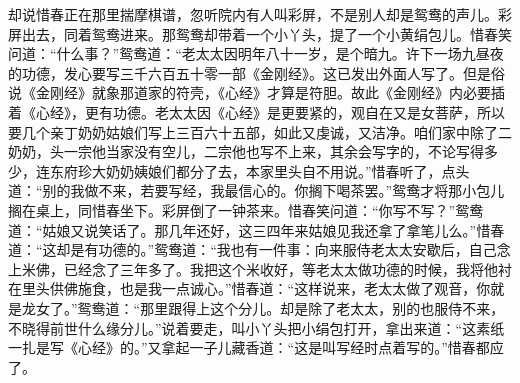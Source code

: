 


\begin{parag}
    却说惜春正在那里揣摩棋谱，忽听院内有人叫彩屏，不是别人却是鸳鸯的声儿。彩屏出去，同着鸳鸯进来。那鸳鸯却带着一个小丫头，提了一个小黄绢包儿。惜春笑问道：“什么事？”鸳鸯道：“老太太因明年八十一岁，是个暗九。许下一场九昼夜的功德，发心要写三千六百五十零一部《金刚经》。这已发出外面人写了。但是俗说《金刚经》就象那道家的符壳，《心经》才算是符胆。故此《金刚经》内必要插着《心经》，更有功德。老太太因《心经》是更要紧的，观自在又是女菩萨，所以要几个亲丁奶奶姑娘们写上三百六十五部，如此又虔诚，又洁净。咱们家中除了二奶奶，头一宗他当家没有空儿，二宗他也写不上来，其余会写字的，不论写得多少，连东府珍大奶奶姨娘们都分了去，本家里头自不用说。”惜春听了，点头道：“别的我做不来，若要写经，我最信心的。你搁下喝茶罢。”鸳鸯才将那小包儿搁在桌上，同惜春坐下。彩屏倒了一钟茶来。惜春笑问道：“你写不写？”鸳鸯道：“姑娘又说笑话了。那几年还好，这三四年来姑娘见我还拿了拿笔儿么。”惜春道：“这却是有功德的。”鸳鸯道：“我也有一件事：向来服侍老太太安歇后，自己念上米佛，已经念了三年多了。我把这个米收好，等老太太做功德的时候，我将他衬在里头供佛施食，也是我一点诚心。”惜春道：“这样说来，老太太做了观音，你就是龙女了。”鸳鸯道：“那里跟得上这个分儿。却是除了老太太，别的也服侍不来，不晓得前世什么缘分儿。”说着要走，叫小丫头把小绢包打开，拿出来道：“这素纸一扎是写《心经》的。”又拿起一子儿藏香道：“这是叫写经时点着写的。”惜春都应了。
\end{parag}


